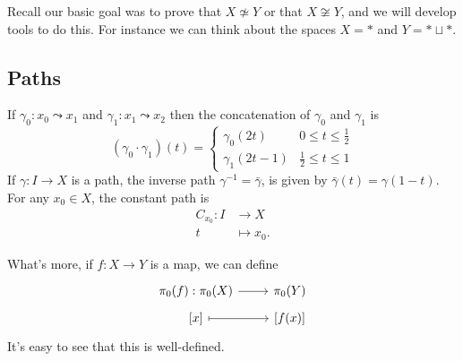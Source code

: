 \documentclass{article}
\numberwithin{nthm}{subsection}
\begin{document}
Recall our basic goal was to prove that $X \not\simeq Y$ or that $X \not \cong Y$, and we will develop tools to do this.
For instance we can think about the spaces $X = *$ and $Y = * \sqcup *$.

\subsection{Paths}

If $\gamma_0: x_0 \leadsto x_1$ and $\gamma_1: x_1 \leadsto x_2$ then the concatenation of $\gamma_0$ and $\gamma_1$ is
\begin{equation*}
    (\gamma_0 \cdot \gamma_1) (t) =
    \begin{cases}
        \gamma_0(2t) & 0 \leq t \leq \frac12 \\
        \gamma_1(2t-1) & \frac12 \leq t \leq 1
    \end{cases}
\end{equation*}
If $\gamma: I \to X$ is a path, the inverse path $\gamma^{-1} = \bar{\gamma}$, is given by $\bar{\gamma}(t) = \gamma(1-t)$.
For any $x_0 \in X$, the constant path is
\begin{align*}
    C_{x_0}: I &\longrightarrow X \\
             t &\longmapsto x_0.
\end{align*}


What's more, if $f: X \to Y$ is a map, we can define
\begin{equation*}
    \begin{tikzcd}[row sep=tiny]
        \pi_0(f) : \pi_0(X) \rar & \pi_0(Y) \\
        \left[x\right] \rar[maps to] & \left[f(x)\right]
    \end{tikzcd}
\end{equation*}
It's easy to see that this is well-defined.
\end{document}
